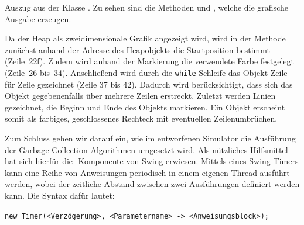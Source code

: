 \begin{listing}[p]
	\inputminted[]{java}{code/CanvasView.java}
	\caption[Auszug aus der Klasse ]{Auszug aus der Klasse . Zu sehen sind die Methoden  und , welche die grafische Ausgabe erzeugen.}
	\label{java:canvas}
\end{listing}

Da der Heap als zweidimensionale Grafik angezeigt wird, wird in der Methode  zunächst anhand der Adresse des Heapobjekts  die Startposition bestimmt (Zeile~22f).
Zudem wird anhand der Markierung die verwendete Farbe festgelegt (Zeile~26 bis~34).
Anschließend wird durch die \texttt{while}-Schleife das Objekt Zeile für Zeile gezeichnet (Zeile 37 bis 42).
Dadurch wird berücksichtigt, dass sich das Objekt gegebenenfalls über mehrere Zeilen erstreckt.
Zuletzt werden Linien gezeichnet, die Beginn und Ende des Objekts markieren.
Ein Objekt erscheint somit als farbiges, geschlossenes Rechteck mit eventuellen Zeilenumbrüchen.

Zum Schluss gehen wir darauf ein, wie im entworfenen Simulator die Ausführung der Garbage-Collection-Algorithmen umgesetzt wird.
Als nützliches Hilfsmittel hat sich hierfür die -Komponente von Swing erwiesen.
Mittels eines Swing-Timers kann eine Reihe von Anweisungen periodisch in einem eigenen Thread ausführt werden, wobei der zeitliche Abstand zwischen zwei Ausführungen definiert werden kann.
Die Syntax dafür lautet:

\vspace*{-0.5cm}
\begin{center}
	\texttt{new Timer(<Verzögerung>, <Parametername> -> <Anweisungsblock>);}
\end{center}

